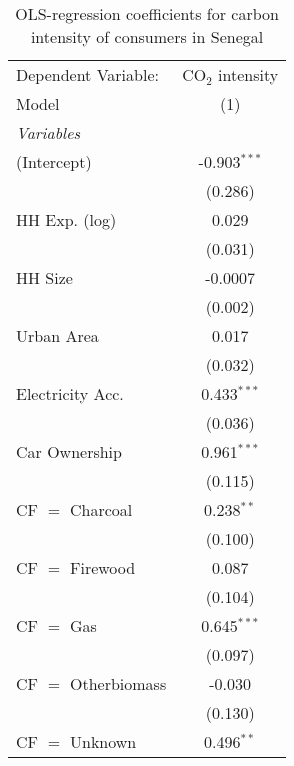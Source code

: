
\begin{table}[htbp!]
   \centering
   \small
   \begin{adjustbox}{width = 1\textwidth, max height = 0.95\textheight, center}
      \begin{threeparttable}[b]
         \caption{\label{tab:OLS_1_SEN} OLS-regression coefficients for carbon intensity of consumers in Senegal}
         \begin{tabular}{lc}
            \tabularnewline \midrule \midrule
            Dependent Variable: & CO$_{2}$ intensity\\  
            Model               & (1)\\  
            \midrule
            \emph{Variables}\\
            (Intercept)         & -0.903$^{***}$\\   
                                & (0.286)\\   
            HH Exp. (log)       & 0.029\\   
                                & (0.031)\\   
            HH Size             & -0.0007\\   
                                & (0.002)\\   
            Urban Area          & 0.017\\   
                                & (0.032)\\   
            Electricity Acc.    & 0.433$^{***}$\\   
                                & (0.036)\\   
            Car Ownership       & 0.961$^{***}$\\   
                                & (0.115)\\   
            CF $=$ Charcoal     & 0.238$^{**}$\\   
                                & (0.100)\\   
            CF $=$ Firewood     & 0.087\\   
                                & (0.104)\\   
            CF $=$ Gas          & 0.645$^{***}$\\   
                                & (0.097)\\   
            CF $=$ Otherbiomass & -0.030\\   
                                & (0.130)\\   
            CF $=$ Unknown      & 0.496$^{**}$\\   

\end{tabular}
\end{threeparttable}
\end{adjustbox}
\end{table}
